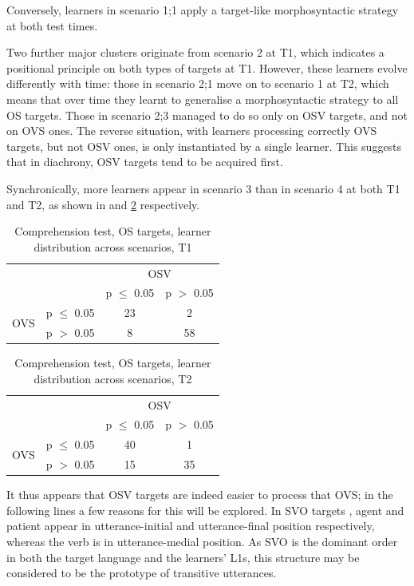 Conversely, learners in scenario 1;1 apply a target-like morphosyntactic strategy at both test times. 

Two further major clusters originate from scenario 2 at T1, which indicates a positional principle on both types of targets at T1. However, these learners evolve differently with time: those in scenario 2;1 move on to scenario 1 at T2, which means that over time they learnt to generalise a morphosyntactic strategy to all OS targets. Those in scenario 2;3 managed to do so only on OSV targets, and not on OVS ones. The reverse situation, with learners processing correctly OVS targets, but not OSV ones, is only instantiated by a single learner. This suggests that in diachrony, OSV targets tend to be acquired first.

Synchronically, more learners appear in scenario 3 than in scenario 4 at both T1 and T2, as shown in  and \ref{tab:05:8} respectively.

\begin{table}
    \begin{tabular}{|lc|cc|}
    \hline
    & & \multicolumn{2}{c|}{OSV}\\
    &  & p ${\leq}$ 0.05 & p $>$ 0.05\\
    \hline
    \multirow{2}{*}{OVS} & p ${\leq}$ 0.05 & 23 & 2\\
    & p $>$ 0.05 & 8 & 58\\
    \hline
    \end{tabular}
    \caption{Comprehension test, OS targets, learner distribution across scenarios, T1}
    \label{tab:05:7}
\end{table}

\begin{table}
    \begin{tabular}{|lc|cc|}
    \hline
    & & \multicolumn{2}{c|}{OSV}\\
    &  & p ${\leq}$ 0.05 & p $>$ 0.05\\
    \hline
    \multirow{2}{*}{OVS}& p ${\leq}$ 0.05 & 40 & 1\\
    & p $>$ 0.05 & 15 & 35\\
    \hline
    \end{tabular}
    \caption{Comprehension test, OS targets, learner distribution across scenarios, T2}
    \label{tab:05:8}
\end{table}

It thus appears that OSV targets are indeed easier to process that OVS; in the following lines a few reasons for this will be explored. In SVO targets , agent and patient appear in utterance-initial and utterance-final position respectively, whereas the verb is in utterance-medial position. As SVO is the dominant order in both the target language and the learners' L1s, this structure may be considered to be the prototype of transitive utterances. 

